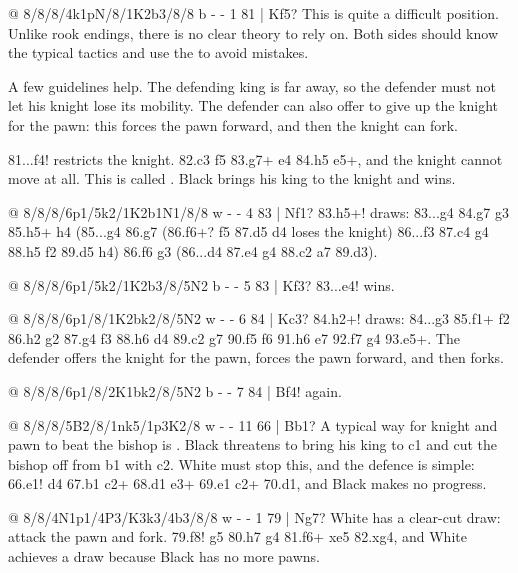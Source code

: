 
@ 8/8/8/4k1pN/8/1K2b3/8/8 b - - 1 81 | Kf5?
This is quite a difficult position. Unlike rook endings, there is no clear theory to rely on.
Both sides should know the typical tactics and use the  to avoid
mistakes.

A few guidelines help. The defending king is far away, so the defender must not let his knight
lose its mobility. The defender can also offer to give up the knight
for the pawn: this forces the pawn forward, and then the knight can fork.

81...\B f4! restricts the knight. 82.\K c3 \K f5 83.\N g7+ \K e4 84.\N h5 \B e5+, and the knight
cannot move at all. This is called . Black brings his king to the knight
and wins.

@ 8/8/8/6p1/5k2/1K2b1N1/8/8 w - - 4 83 | Nf1?
83.\N h5+! draws: 83...\K g4 84.\N g7 \K g3 85.\N h5+ \K h4 (85...\K g4 86.\N g7 (86.\N f6+?
\K f5 87.\N d5 \B d4 loses the knight) 86...\K f3 87.\K c4 g4 88.\N h5 \B f2 89.\K d5 \B h4)
86.\N f6 \K g3 (86...\B d4 87.\N e4 g4 88.\K c2 \B a7 89.\K d3).

@ 8/8/8/6p1/5k2/1K2b3/8/5N2 b - - 5 83 | Kf3?
83...\K e4! wins.

@ 8/8/8/6p1/8/1K2bk2/8/5N2 w - - 6 84 | Kc3?
84.\N h2+! draws: 84...\K g3 85.\N f1+ \K f2 86.\N h2 \K g2 87.\N g4 \K f3 88.\N h6 \B d4
89.\K c2 \B g7 90.\N f5 \B f6 91.\N h6 \B e7 92.\N f7 g4 93.\N e5+. The defender offers the
knight for the pawn, forces the pawn forward, and then forks.

@ 8/8/8/6p1/8/2K1bk2/8/5N2 b - - 7 84 | Bf4!
 again.

@ 8/8/8/5B2/8/1nk5/1p3K2/8 w - - 11 66 | Bb1?
A typical way for knight and pawn to beat the bishop is . Black threatens to bring his king to c1 and cut the bishop off
from b1 with \N c2. White must stop this, and the defence is simple: 66.\K e1! \N d4 67.\B b1
\N c2+ 68.\K d1 \N e3+ 69.\K e1 \N c2+ 70.\K d1, and Black makes no progress.

@ 8/8/4N1p1/4P3/K3k3/4b3/8/8 w - - 1 79 | Ng7?
White has a clear-cut draw: attack the pawn and fork.
79.\N f8! g5 80.\N h7 g4 81.\N f6+ \K xe5 82.\N xg4, and White achieves a draw because
Black has no more pawns.

